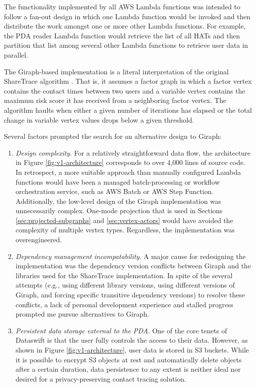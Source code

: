 \par The functionality implemented by all AWS Lambda functions was intended to follow a fan-out design in which one Lambda function would be invoked and then distribute the work amongst one or more other Lambda functions. For example, the PDA reader Lambda function would retrieve the list of all HATs and then partition that list among several other Lambda functions to retrieve user data in parallel.

\par The Giraph-based implementation is a literal interpretation of the original ShareTrace algorithm \cite{Ayday2021}. That is, it assumes a factor graph in which a factor vertex contains the contact times between two users and a variable vertex contains the maximum risk score it has received from a neighboring factor vertex. The algorithm haults when either a given number of iterations has elapsed or the total change in variable vertex values drops below a given threshold.

\par Several factors prompted the search for an alternative design to Giraph:

\begin{enumerate}
	\item \emph{Design complexity}. For a relatively straightforward data flow, the architecture in Figure \ref{fig:v1-architecture} corresponds to over 4,000 lines of source code. In retrospect, a more suitable approach than manually configured Lambda  functions would have been a managed batch-processing or workflow orchestration service, such as AWS Batch or AWS Step Function. Additionally, the low-level design of the Giraph implementation was unnecessarily complex. One-mode projection that is used in Sections \ref{sec:projected-subgraphs} and \ref{sec:vertex-actors} would have avoided the complexity of multiple vertex types. Regardless, the implementation was overengineered.
	\item \emph{Dependency management incompatability}. A major cause for redesigning the implementation was the dependency version conflicts between Giraph and the libraries used for the ShareTrace implementation. In spite of the several attempts (e.g., using different library versions, using different versions of Giraph, and forcing specific transitive dependency versions) to resolve these conflicts, a lack of personal development experience and stalled progress prompted me pursue alternatives to Giraph.
	\item \emph{Persistent data storage external to the PDA}. One of the core tenets of Dataswift is that the user fully controls the access to their data. However, as shown in Figure \ref{fig:v1-architecture}, user data is stored in S3 buckets. While it is possible to encrypt S3 objects at rest and automatically delete objects after a certain duration, data persistence to any extent is neither ideal nor desired for a privacy-preserving contact tracing solution.
\end{enumerate}

